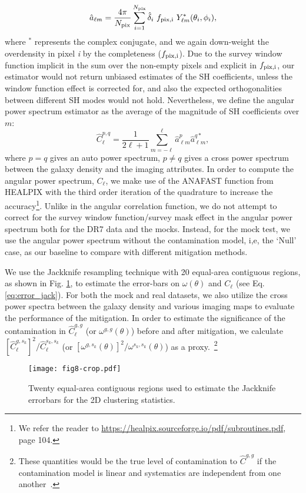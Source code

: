 \documentclass[fleqn, usenatbib]{mnras}
\begin{document}
\begin{itemize}
    \begin{equation}
        \hat{a}_{\ell m} = \frac{4\pi}{N_{{\rm pix}}} \sum_{i=1}^{N_{{\rm pix}}}  \hat{\delta}_{i}~f_{\rm pix, i}~ Y^{*}_{\ell m}(\theta_{i}, \phi_{i}),
    \end{equation}
    where $^{*}$ represents the complex conjugate, and we again down-weight the overdensity in pixel \textit{i} by the completeness ($f_{\rm pix, i}$). Due to the survey window function implicit in the sum over the non-empty pixels and explicit in $f_{\rm pix, i}$, our estimator would not return unbiased estimates of the SH coefficients, unless the window function effect is corrected for, and also the expected orthogonalities between different SH modes would not hold. Nevertheless, we define the angular power spectrum estimator as the average of the magnitude of SH coefficients over $m$:
    \begin{equation}
        \hat{C}^{p,q}_{\ell} = \frac{1}{2\ell +1} \sum_{m=-\ell}^{\ell} \hat{a}^{p}_{\ell m} \hat{a}^{q*}_{\ell m},
    \end{equation}
    where $p=q$ gives an auto power spectrum, $p\neq q$ gives a cross power spectrum between the galaxy density and the imaging attributes. In order to compute the angular power spectrum, $C_{\ell}$, we make use of the ANAFAST function from HEALPIX \citep{gorski2005healpix} with the third order iteration of the quadrature to increase the accuracy\footnote{We refer the reader to \url{https://healpix.sourceforge.io/pdf/subroutines.pdf}, page 104.}. 
    Unlike in the angular correlation function, we do not attempt to correct for the survey window function/survey mask effect in the angular power spectrum both for the DR7 data and the mocks. Instead, for the mock test, we use the angular power spectrum without the contamination model, i,e, the `Null' case, as our baseline to compare with different mitigation methods.\\ 
\end{itemize}
%
%
We use the Jackknife resampling technique with 20 equal-area contiguous regions, as shown in Fig. \ref{fig:jackknifes}, to estimate the error-bars on $\omega (\theta)$ and $C_{\ell}$ (see Eq. \ref{eq:error_jack}). For both the mock and real datasets, we also utilize the cross power spectra between the galaxy density and various imaging maps to evaluate the performance of the  mitigation. In order to estimate the significance of the contamination in $\hat{C}^{g,g}_{\ell}$ (or $\omega^{g,g} (\theta)$) before and after mitigation, we calculate $[\hat{C}^{g,s_k}_{\ell}]^2/\hat{C}^{s_k,s_k}_{\ell}$ (or $[\omega^{g,s_k}(\theta)]^2/\omega^{s_k,s_k}(\theta)$) as a proxy.~\footnote{These quantities would be the true level of contamination to $\hat{C}^{g,g}$ if the contamination model is linear and systematics are independent from one another~\citep{ashley2012MNRAS,2012ApJ...761...14H}.}
\begin{figure}
        \centering
        \texttt{[image: fig8-crop.pdf]}
        \caption{Twenty equal-area contiguous regions used to estimate the Jackknife errorbars for the 2D clustering statistics.}
        \label{fig:jackknifes}
\end{figure}
    
\end{document}
